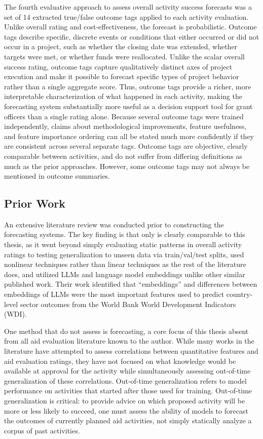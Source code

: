 \documentclass[12pt,a4paper]{article}
\let\citep\parencite
\begin{document}
The fourth evaluative approach to assess overall activity success forecasts was a set of 14 extracted true/false outcome tags applied to each activity evaluation. Unlike overall rating and cost-effectiveness, the forecast is probabilistic. Outcome tags describe specific, discrete events or conditions that either occurred or did not occur in a project, such as whether the closing date was extended, whether targets were met, or whether funds were reallocated. Unlike the scalar overall success rating, outcome tags capture qualitatively distinct axes of project execution and make it possible to forecast specific types of project behavior rather than a single aggregate score. Thus, outcome tags provide a richer, more interpretable characterization of what happened in each activity, making the forecasting system substantially more useful as a decision support tool for grant officers than a single rating alone. Because several outcome tags were trained independently, claims about methodological improvements, feature usefulness, and feature importance ordering can all be stated much more confidently if they are consistent across several separate tags. Outcome tags are objective, clearly comparable between activities, and do not suffer from differing definitions as much as the prior approaches. However, some outcome tags may not always be mentioned in outcome summaries.


\subsection{Prior Work}

An extensive literature review was conducted prior to constructing the forecasting systems. The key finding is that only \citep{goldembergMindingGapAid2025} is clearly comparable to this thesis, as it went beyond simply evaluating static patterns in overall activity ratings to testing generalization to unseen data via train/val/test splits, used nonlinear techniques rather than linear techniques as the rest of the literature does, and utilized LLMs and language model embeddings unlike other similar published work. Their work identified that ``embeddings'' and differences between embeddings of LLMs were the most important features used to predict country-level sector outcomes from the World Bank World Development Indicators (WDI).

One method that \citep{goldembergMindingGapAid2025} do not assess is forecasting, a core focus of this thesis absent from all aid evaluation literature known to the author. While many works in the literature have attempted to assess correlations between quantitative features and aid evaluation ratings, they have not focused on what knowledge would be available at approval for the activity while simultaneously assessing out-of-time generalization of these correlations. Out-of-time generalization refers to model performance on activities that started after those used for training. Out-of-time generalization is critical: to provide advice on which proposed activity will be more or less likely to succeed, one must assess the ability of models to forecast the outcomes of currently planned aid activities, not simply statically analyze a corpus of past activities.
\end{document}
